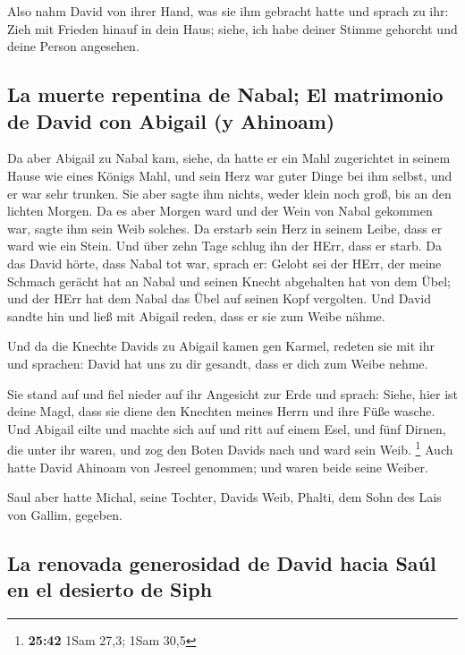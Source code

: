  Also nahm David von ihrer Hand, was sie ihm gebracht
hatte und sprach zu ihr: Zieh mit Frieden hinauf in dein Haus; siehe,
ich habe deiner Stimme gehorcht und deine Person angesehen.

\hypertarget{la-muerte-repentina-de-nabal-el-matrimonio-de-david-con-abigail-y-ahinoam}{%
\subsection{La muerte repentina de Nabal; El matrimonio de David con
Abigail (y
Ahinoam)}\label{la-muerte-repentina-de-nabal-el-matrimonio-de-david-con-abigail-y-ahinoam}}

 Da aber Abigail zu Nabal kam, siehe, da hatte er ein
Mahl zugerichtet in seinem Hause wie eines Königs Mahl, und sein Herz
war guter Dinge bei ihm selbst, und er war sehr trunken. Sie aber sagte
ihm nichts, weder klein noch groß, bis an den lichten Morgen.
 Da es aber Morgen ward und der Wein von Nabal gekommen
war, sagte ihm sein Weib solches. Da erstarb sein Herz in seinem Leibe,
dass er ward wie ein Stein.  Und über zehn Tage schlug
ihn der HErr, dass er starb.  Da das David hörte, dass
Nabal tot war, sprach er: Gelobt sei der HErr, der meine Schmach gerächt
hat an Nabal und seinen Knecht abgehalten hat von dem Übel; und der HErr
hat dem Nabal das Übel auf seinen Kopf vergolten. Und David sandte hin
und ließ mit Abigail reden, dass er sie zum Weibe nähme.

 Und da die Knechte Davids zu Abigail kamen gen Karmel,
redeten sie mit ihr und sprachen: David hat uns zu dir gesandt, dass er
dich zum Weibe nehme.

 Sie stand auf und fiel nieder auf ihr Angesicht zur Erde
und sprach: Siehe, hier ist deine Magd, dass sie diene den Knechten
meines Herrn und ihre Füße wasche.  Und Abigail eilte und
machte sich auf und ritt auf einem Esel, und fünf Dirnen, die unter ihr
waren, und zog den Boten Davids nach und ward sein Weib. \footnote{\textbf{25:42}
  1Sam 27,3; 1Sam 30,5}  Auch hatte David Ahinoam von
Jesreel genommen; und waren beide seine Weiber.

 Saul aber hatte Michal, seine Tochter, Davids Weib,
Phalti, dem Sohn des Lais von Gallim, gegeben.

\hypertarget{la-renovada-generosidad-de-david-hacia-sauxfal-en-el-desierto-de-siph}{%
\subsection{La renovada generosidad de David hacia Saúl en el desierto
de
Siph}\label{la-renovada-generosidad-de-david-hacia-sauxfal-en-el-desierto-de-siph}}

